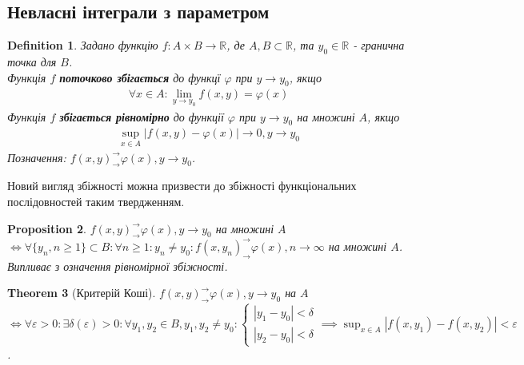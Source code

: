 \documentclass[a4paper, 10pt]{article}
\def\huge{\displaystyle}
\theoremstyle{theoremdd}
\newtheorem{theorem}{Theorem}[subsection]
\theoremstyle{theoremdd}
\newtheorem{definition}[theorem]{Definition}
\theoremstyle{theoremdd}
\theoremstyle{theoremdd}
\theoremstyle{theoremdd}
\newtheorem{proposition}[theorem]{Proposition}
\theoremstyle{theoremdd}
\theoremstyle{theoremdd}
\theoremstyle{theoremdd}
\begin{document}
\subsection{Невласні інтеграли з параметром}
\begin{definition}
Задано функцію $f: A \times B \to \mathbb{R}$, де $A,B \subset \mathbb{R}$, та $y_0 \in \mathbb{R}$ - гранична точка для $B$.\\
Функція $f$ \textbf{поточково збігається} до функцї $\varphi$ при $y \to y_0$, якщо
\begin{align*}
\forall x \in A: \lim_{y \to y_0} f(x,y) = \varphi(x)
\end{align*}
Функція $f$ \textbf{збігається рівномірно} до функції $\varphi$ при $y \to y_0$ на множині $A$, якщо
\begin{align*}
\huge\sup_{x \in A} |f(x,y) - \varphi(x)| \to 0, y \to y_0
\end{align*}
Позначення: $f(x,y)^\rightarrow_\rightarrow \varphi(x), y \to y_0$.
\end{definition}

Новий вигляд збіжності можна призвести до збіжності функціональних послідовностей таким твердженням.

\begin{proposition}
$f(x,y)^\rightarrow_\rightarrow \varphi(x), y \to y_0$ на множині $A$ $\iff \forall \{y_n, n \geq 1\} \subset B: \forall n \geq 1: y_n \neq y_0: f(x,y_n)^\rightarrow_\rightarrow \varphi(x), n \to \infty$ на множині $A$.\\
\textit{Випливає з означення рівномірної збіжності.}
\end{proposition}

\begin{theorem}[Критерій Коші]
$f(x,y)^\rightarrow_\rightarrow \varphi(x), y \to y_0$ на $A$ $\iff \forall \varepsilon > 0: \exists \delta(\varepsilon) > 0: \forall y_1,y_2 \in B, y_1,y_2 \neq y_0: \begin{cases} |y_1-y_0| < \delta \\ |y_2-y_0| < \delta \end{cases} \implies \huge\sup_{x \in A} |f(x,y_1)-f(x,y_2)| < \varepsilon$.\\
\end{theorem}
\end{document}
